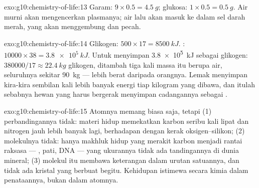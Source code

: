 \begin{solution}{exo:g10:chemistry-of-life:13}
Garam: $9 \times 0.5 = \qty{4.5}{g}$; glukosa: $1 \times 0.5 =
\qty{0.5}{g}$. Air murni akan mengencerkan plasmanya; air lalu akan
masuk ke dalam sel darah merah, yang akan menggembung dan pecah.
\end{solution}

\begin{solution}{exo:g10:chemistry-of-life:14}
Glikogen: $500 \times 17 = \qty{8500}{kJ}$. : $10000 \times 38 =
\qty{3.8e5}{kJ}$. Untuk menyimpan \qty{3.8e5}{kJ} sebagai glikogen: $380000/17
\approx \qty{22.4}{kg}$ glikogen, ditambah tiga kali massa itu berupa
air, seluruhnya sekitar \qty{90}{kg} --- lebih berat daripada orangnya.
Lemak menyimpan kira-kira sembilan kali lebih banyak energi tiap
kilogram yang dibawa, dan itulah sebabnya hewan yang harus bergerak menyimpan cadangannya sebagai .
\end{solution}

\begin{solution}{exo:g10:chemistry-of-life:15}
Atomnya memang biasa saja, tetapi (1) perbandingannya tidak: materi
hidup memekatkan karbon seribu kali lipat dan nitrogen jauh lebih
banyak lagi, berhadapan dengan kerak oksigen--silikon; (2) molekulnya
tidak: hanya makhluk hidup yang merakit karbon menjadi rantai raksasa
--- , pati, DNA --- yang ukurannya tidak ada tandingannya di
dunia mineral; (3) molekul itu membawa keterangan dalam urutan
satuannya, dan tidak ada kristal yang berbuat begitu. Kehidupan
istimewa secara kimia dalam penataannya, bukan dalam atomnya.
\end{solution}

